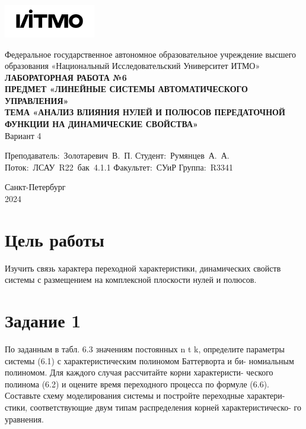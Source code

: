 \documentclass[a4paper, 12pt]{article}
\begin{document}
    \begin{titlepage}

        \begin{center}
        \includegraphics[width=0.3\textwidth]{itmo.png} %
        \vfill
        
        Федеральное государственное автономное образовательное учреждение высшего образования
        «Национальный Исследовательский Университет ИТМО»\\
        
        \vfill
        {\large\bf ЛАБОРАТОРНАЯ РАБОТА №6}\\
        {\large\bf ПРЕДМЕТ «ЛИНЕЙНЫЕ СИСТЕМЫ АВТОМАТИЧЕСКОГО УПРАВЛЕНИЯ»}\\
        {\large\bf ТЕМА «АНАЛИЗ ВЛИЯНИЯ НУЛЕЙ И ПОЛЮСОВ ПЕРЕДАТОЧНОЙ ФУНКЦИИ НА ДИНАМИЧЕСКИЕ СВОЙСТВА»}\\
        Вариант 4
        \vfill

        \begin{flushright}
            \begin{minipage}{.45\textwidth}
            {
                \hbox{Преподаватель: Золотаревич В. П.}
                \hbox{Студент: Румянцев А. А.}
                \hbox{Поток: ЛСАУ R22 бак 4.1.1}
                \hbox{}
                \hbox{Факультет: СУиР}
                \hbox{Группа: R3341}
            }
            \end{minipage}
        \end{flushright}
        
        \vfill
                
        Санкт-Петербург\\
        2024
        \end{center}
    \end{titlepage}
    
    \tableofcontents

    \newpage
    \section{Цель работы}
    Изучить связь характера переходной характеристики,
    динамических свойств системы с размещением на комплексной
    плоскости нулей и полюсов.


    \section{Задание 1}
    По заданным в табл. 6.3 значениям постоянных n t k, определите
    параметры системы (6.1) с характеристическим полиномом Баттерворта и би-
    номиальным полиномом. Для каждого случая рассчитайте корни характеристи-
    ческого полинома (6.2) и оцените время переходного процесса по формуле (6.6).
    Составьте схему моделирования системы и постройте переходные характери-
    стики, соответствующие двум типам распределения корней характеристическо-
    го уравнения.
\end{document}
